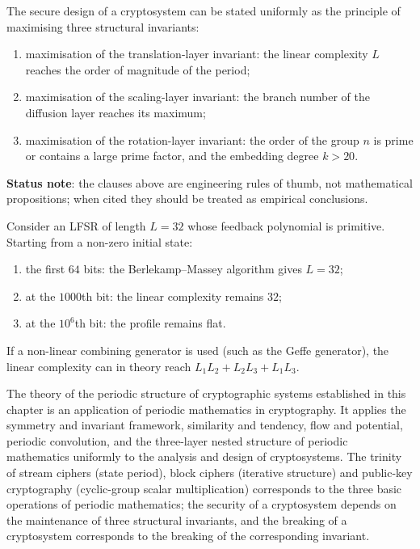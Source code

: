 \begin{remark}\label{cor:crypto_design}
The secure design of a cryptosystem can be stated uniformly as the principle of maximising three structural invariants:
\begin{enumerate}[label=(\roman*)]
    \item maximisation of the translation-layer invariant: the linear complexity \(L\) reaches the order of magnitude of the period;
    \item maximisation of the scaling-layer invariant: the branch number of the diffusion layer reaches its maximum;
    \item maximisation of the rotation-layer invariant: the order of the group \(n\) is prime or contains a large prime factor, and the embedding degree \(k>20\).
\end{enumerate}
\textbf{Status note}: the clauses above are engineering rules of thumb, not mathematical propositions; when cited they should be treated as empirical conclusions.
\end{remark}

\begin{example}\label{ex:lfsr_diagnosis}
Consider an LFSR of length \(L=32\) whose feedback polynomial is primitive. Starting from a non-zero initial state:
\begin{enumerate}[label=(\roman*)]
    \item the first \(64\) bits: the Berlekamp--Massey algorithm gives \(L=32\);
    \item at the \(1000\)th bit: the linear complexity remains \(32\);
    \item at the \(10^6\)th bit: the profile remains flat.
\end{enumerate}
If a non-linear combining generator is used (such as the Geffe generator), the linear complexity can in theory reach \(L_1L_2+L_2L_3+L_1L_3\).
\end{example}

\begin{remark}\label{rem:crypto_book_interface}
The theory of the periodic structure of cryptographic systems established in this chapter is an application of periodic mathematics in cryptography. It applies the symmetry and invariant framework, similarity and tendency, flow and potential, periodic convolution, and the three-layer nested structure of periodic mathematics uniformly to the analysis and design of cryptosystems. The trinity of stream ciphers (state period), block ciphers (iterative structure) and public-key cryptography (cyclic-group scalar multiplication) corresponds to the three basic operations of periodic mathematics; the security of a cryptosystem depends on the maintenance of three structural invariants, and the breaking of a cryptosystem corresponds to the breaking of the corresponding invariant.
\end{remark}

